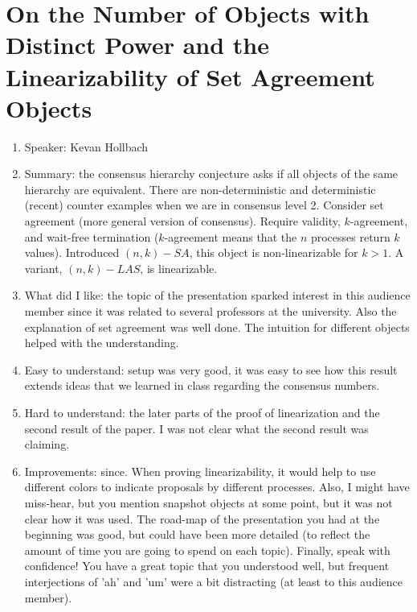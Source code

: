 \documentclass[twoside]{article}
\begin{document}
\section{On the Number of Objects with Distinct Power and the Linearizability of Set Agreement Objects}
\begin{enumerate}
\item Speaker: Kevan Hollbach
\item Summary: the consensus hierarchy conjecture asks if all objects of the same hierarchy are equivalent. There are non-deterministic and deterministic (recent) counter examples when we are in consensus level 2. Consider set agreement (more general version of consensus). Require validity, $k$-agreement, and wait-free termination ($k$-agreement means that the $n$ processes return $k$ values). Introduced $(n,k)-SA$, this object is non-linearizable for $k > 1$. A variant, $(n,k)-LAS$, is linearizable.
\item What did I like: the topic of the presentation sparked interest in this audience member since it was related to several professors at the university. Also the explanation of set agreement was well done. The intuition for different objects helped with the understanding. 
\item Easy to understand: setup was very good, it was easy to see how this result extends ideas that we learned in class regarding the consensus numbers. 
\item Hard to understand: the later parts of the proof of linearization and the second result of the paper. I was not clear what the second result was claiming. 
\item Improvements: since. When proving linearizability, it would help to use different colors to indicate proposals by different processes. Also, I might have miss-hear, but you mention snapshot objects at some point, but it was not clear how it was used. The road-map of the presentation you had at the beginning was good, but could have been more detailed (to reflect the amount of time you are going to spend on each topic). Finally, speak with confidence! You have a great topic that you understood well, but frequent interjections of 'ah' and 'um' were a bit distracting (at least to this audience member).
\end{enumerate}
\end{document}
